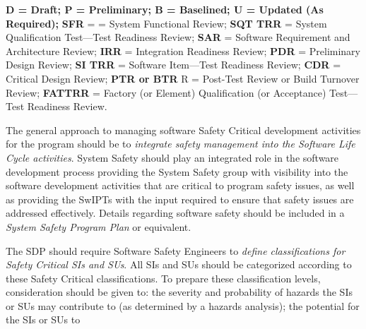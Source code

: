 \textbf{D = Draft; P = Preliminary; B = Baselined; U = Updated (As Required);} \textbf{SFR} = = System Functional Review; \textbf{SQT TRR} = System Qualification Test—Test Readiness Review; \textbf{SAR} = Software Requirement and Architecture Review; \textbf{IRR} = Integration Readiness Review; \textbf{PDR} = Preliminary Design Review; \textbf{SI TRR}  = Software Item—Test Readiness Review; \textbf{CDR} = Critical Design
Review;  \textbf{PTR or BTR} R = Post-Test Review or Build Turnover Review; \textbf{FATTRR} = Factory (or Element) Qualification (or Acceptance) Test—Test Readiness Review.



The general approach to managing software Safety
Critical development activities for the program should be
to \textit{integrate safety management into the Software Life Cycle
activities}. System Safety should play an integrated role in the
software development process providing the System Safety
group with visibility into the software development activities
that are critical to program safety issues, as well as providing the SwIPTs with the input required to ensure that safety
issues are addressed effectively. Details regarding software safety should be included in a \textit{System Safety Program Plan} or equivalent.

The SDP should require Software Safety Engineers to
\textit{define classifications for Safety Critical SIs and SUs}. All SIs and
SUs should be categorized according to these Safety Critical
classifications. To prepare these classification levels, consideration should be given to: the severity and probability
of hazards the SIs or SUs may contribute to (as determined
by a hazards analysis); the potential for the SIs or SUs to
